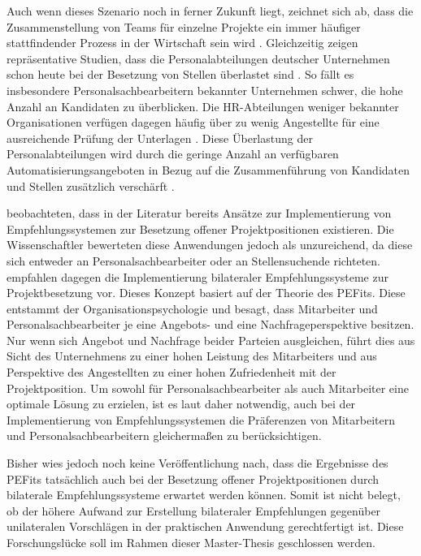 Auch wenn dieses Szenario noch in ferner Zukunft liegt, zeichnet sich ab, dass die Zusammenstellung von Teams für einzelne Projekte ein immer häufiger stattfindender Prozess in der Wirtschaft sein wird \cite[S. 2]{malinowski:2008}. Gleichzeitig zeigen repräsentative Studien, dass die Personalabteilungen deutscher Unternehmen schon heute bei der Besetzung von Stellen überlastet sind \cite[S. 244]{personalbeschaffung:2017}. So fällt es insbesondere Personalsachbearbeitern bekannter Unternehmen schwer, die hohe Anzahl an Kandidaten zu überblicken. Die HR-Abteilungen weniger bekannter Organisationen verfügen dagegen häufig über zu wenig Angestellte für eine ausreichende Prüfung der Unterlagen \cite[S. 8]{hays:2013}. Diese Überlastung der Personalabteilungen wird durch die geringe Anzahl an verfügbaren Automatisierungsangeboten in Bezug auf die Zusammenführung von Kandidaten und Stellen zusätzlich verschärft \cite[S. 15]{hays:2013}.

\textcite{malinowski:2008} beobachteten, dass in der Literatur bereits Ansätze zur Implementierung von Empfehlungssystemen zur Besetzung offener Projektpositionen existieren. Die Wissenschaftler bewerteten diese Anwendungen jedoch als unzureichend, da diese sich entweder an Personalsachbearbeiter oder an Stellensuchende richteten. \textcite{malinowski:2008} empfahlen dagegen die Implementierung bilateraler Empfehlungssysteme zur Projektbesetzung vor. Dieses Konzept basiert auf der Theorie des \acp{PEFit}. Diese entstammt der Organisationspsychologie und besagt, dass Mitarbeiter und Personalsachbearbeiter je eine Angebots- und eine Nachfrageperspektive besitzen. Nur wenn sich Angebot und Nachfrage beider Parteien ausgleichen, führt dies aus Sicht des Unternehmens zu einer hohen Leistung des Mitarbeiters und aus Perspektive des Angestellten zu einer hohen Zufriedenheit mit der Projektposition. Um sowohl für Personalsachbearbeiter als auch Mitarbeiter eine optimale Lösung zu erzielen, ist es laut \textcite{malinowski:2008} daher notwendig, auch bei der Implementierung von Empfehlungssystemen die Präferenzen von Mitarbeitern und Personalsachbearbeitern gleichermaßen zu berücksichtigen.

Bisher wies jedoch noch keine Veröffentlichung nach, dass die Ergebnisse des \acp{PEFit} tatsächlich auch bei der Besetzung offener Projektpositionen durch bilaterale Empfehlungssysteme erwartet werden können. Somit ist nicht belegt, ob der höhere Aufwand zur Erstellung bilateraler Empfehlungen gegenüber unilateralen Vorschlägen in der praktischen Anwendung gerechtfertigt ist. Diese Forschungslücke soll im Rahmen dieser Master-Thesis geschlossen werden.

